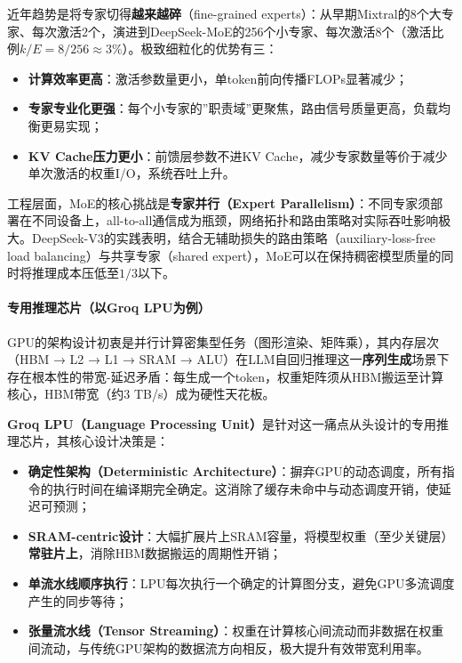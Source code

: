 \documentclass[12pt,a4paper]{article}
\begin{document}
近年趋势是将专家切得\textbf{越来越碎}（fine-grained experts）：从早期Mixtral的8个大专家、每次激活2个，演进到DeepSeek-MoE的256个小专家、每次激活8个（激活比例$k/E = 8/256 \approx 3\%$）。极致细粒化的优势有三：
\begin{itemize}
    \item \textbf{计算效率更高}：激活参数量更小，单token前向传播FLOPs显著减少；
    \item \textbf{专家专业化更强}：每个小专家的”职责域”更聚焦，路由信号质量更高，负载均衡更易实现；
    \item \textbf{KV Cache压力更小}：前馈层参数不进KV Cache，减少专家数量等价于减少单次激活的权重I/O，系统吞吐上升。
\end{itemize}

工程层面，MoE的核心挑战是\textbf{专家并行（Expert Parallelism）}：不同专家须部署在不同设备上，all-to-all通信成为瓶颈，网络拓扑和路由策略对实际吞吐影响极大。DeepSeek-V3的实践表明，结合无辅助损失的路由策略（auxiliary-loss-free load balancing）与共享专家（shared expert），MoE可以在保持稠密模型质量的同时将推理成本压低至$1/3$以下。

\paragraph{专用推理芯片（以Groq LPU为例）}

GPU的架构设计初衷是并行计算密集型任务（图形渲染、矩阵乘），其内存层次（HBM → L2 → L1 → SRAM → ALU）在LLM自回归推理这一\textbf{序列生成}场景下存在根本性的带宽-延迟矛盾：每生成一个token，权重矩阵须从HBM搬运至计算核心，HBM带宽（约3 TB/s）成为硬性天花板。

\textbf{Groq LPU（Language Processing Unit）}是针对这一痛点从头设计的专用推理芯片，其核心设计决策是：
\begin{itemize}
    \item \textbf{确定性架构（Deterministic Architecture）}：摒弃GPU的动态调度，所有指令的执行时间在编译期完全确定。这消除了缓存未命中与动态调度开销，使延迟可预测；
    \item \textbf{SRAM-centric设计}：大幅扩展片上SRAM容量，将模型权重（至少关键层）\textbf{常驻片上}，消除HBM数据搬运的周期性开销；
    \item \textbf{单流水线顺序执行}：LPU每次执行一个确定的计算图分支，避免GPU多流调度产生的同步等待；
    \item \textbf{张量流水线（Tensor Streaming）}：权重在计算核心间流动而非数据在权重间流动，与传统GPU架构的数据流方向相反，极大提升有效带宽利用率。
\end{itemize}
\end{document}
